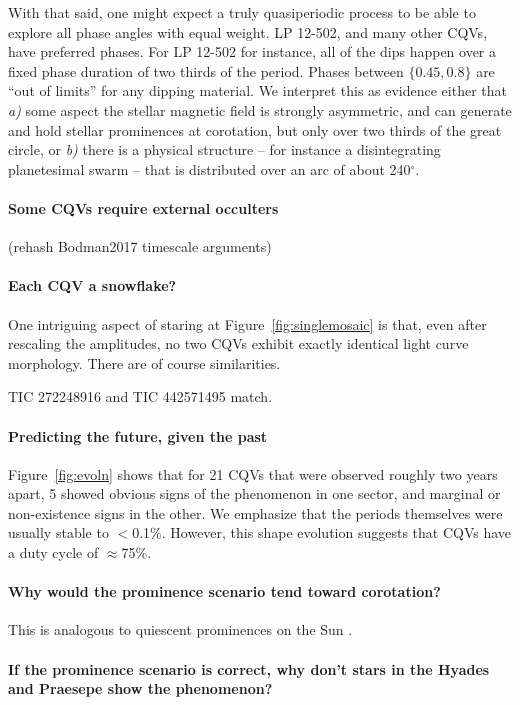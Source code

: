 \documentclass[11pt,twocolumn,tighten]{aastex63}
\begin{document}
With that said, one might expect a truly quasiperiodic process to be
able to explore all phase angles with equal weight.  LP 12-502, and
many other CQVs, have preferred phases.  For LP 12-502 for instance,
all of the dips happen over a fixed phase duration of two thirds of
the period.  Phases between $\{0.45,0.8\}$ are ``out of limits'' for
any dipping material.  We interpret this as evidence
either that {\it a)} some aspect the stellar magnetic field is
strongly asymmetric, and can generate and hold stellar prominences at
corotation, but only over two thirds of the great circle,
or {\it b)} there is a physical structure -- for instance a
disintegrating planetesimal swarm -- that is distributed over an arc
of about 240$^\circ$.


\paragraph{Some CQVs require external occulters}
(rehash Bodman2017 timescale arguments)


\paragraph{Each CQV a snowflake?}
One intriguing aspect of staring at Figure~\ref{fig:singlemosaic}
is that, even after rescaling the amplitudes, no two CQVs
exhibit exactly identical light curve morphology.
There are of course similarities.

TIC 272248916 and TIC 442571495 match.


\paragraph{Predicting the future, given the past}
Figure~\ref{fig:evoln}
shows that for 21 CQVs that were observed roughly two years
apart, 5 showed obvious signs of the phenomenon in one sector,
and marginal or non-existence signs in the other.
We emphasize that the periods themselves were usually stable to $<$0.1\%.
However, this shape evolution
suggests that CQVs have a duty cycle of $\approx$75\%.


\paragraph{Why would the prominence scenario tend toward corotation?}
This is analogous to quiescent
prominences on the Sun \citep{1967SoPh....2...39K}.


\paragraph{If the prominence scenario is correct, why don't stars in the
Hyades and Praesepe show the phenomenon?}
\end{document}

